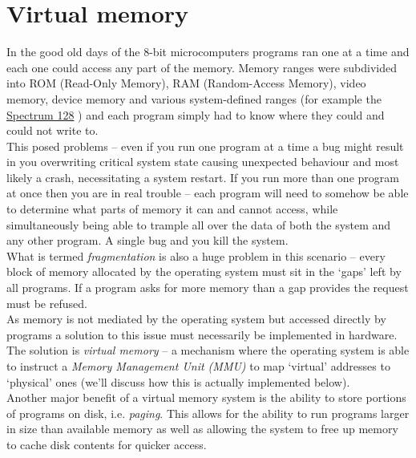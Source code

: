 \section{Virtual memory}

In the good old days of the 8-bit microcomputers programs ran one at a time and
each one could access any part of the memory. Memory ranges were subdivided into
ROM (Read-Only Memory), RAM (Random-Access Memory), video memory, device memory
and various system-defined ranges (for example the
\href{https://worldofspectrum.org/ZXSpectrum128+3Manual/chapter8pt24.html}{Spectrum
  128} \autocite{spectrum128-manual:c8pt24}) and each program simply had to know
where they could and could not write to.\\

This posed problems -- even if you run one program at a time a bug might result in
you overwriting critical system state causing unexpected behaviour and most
likely a crash, necessitating a system restart. If you run more than one program
at once then you are in real trouble -- each program will need to somehow be
able to determine what parts of memory it can and cannot access, while
simultaneously being able to trample all over the data of both the system and
any other program. A single bug and you kill the system.\\

What is termed \emph{fragmentation} is also a huge problem in this scenario --
every block of memory allocated by the operating system must sit in the `gaps'
left by all programs. If a program asks for more memory than a gap provides the
request must be refused.\\

As memory is not mediated by the operating system but accessed directly by
programs a solution to this issue must necessarily be implemented in
hardware. The solution is \emph{virtual memory} -- a mechanism where the
operating system is able to instruct a \emph{Memory Management Unit (MMU)} to
map `virtual' addresses to `physical' ones (we'll discuss how this is actually
implemented below).\\

Another major benefit of a virtual memory system is the ability to store
portions of programs on disk, i.e. \emph{paging}. This allows for
the ability to run programs larger in size than available memory as well as
allowing the system to free up memory to cache disk contents for quicker
access.\\

